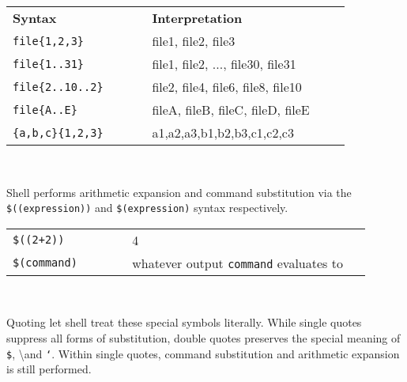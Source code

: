 \documentclass[landscape,a0paper,fontscale=0.285]{baposter} %
\begin{document}
\begin{poster}
{\begin{tabular}{p{0.35\linewidth}p{0.5\linewidth}}
\multicolumn{1}{l}{\textbf{Syntax}} & \multicolumn{1}{l}{\textbf{Interpretation}} \\
\texttt{\small{file\{1,2,3\}}} & file1, file2, file3\\
\texttt{\small{file\{1..31\}}} & file1, file2, ..., file30, file31\\
\texttt{\small{file\{2..10..2\}}} & file2, file4, file6, file8, file10\\
\texttt{\small{file\{A..E\}}} & fileA, fileB, fileC, fileD, fileE \\
\texttt{\small{\{a,b,c\}\{1,2,3\}}} & a1,a2,a3,b1,b2,b3,c1,c2,c3\\
\end{tabular}\\


Shell performs arithmetic expansion and command substitution via the \texttt{\small{\$((expression))}} and \texttt{\small{\$(expression)}} syntax respectively. \\

\begin{tabular}{p{0.3\linewidth}p{0.6\linewidth}}
\texttt{\small{\$((2+2))}} & 4 \\
\texttt{\small{\$(command)}} & whatever output \texttt{\small{command}} evaluates to
\end{tabular}\\

\normal
{}

Quoting let shell treat these special symbols literally. While single quotes suppress all forms of substitution, double quotes preserves the special meaning of \texttt{\$}, \textbackslash and \texttt{`}. Within single quotes,
command substitution and arithmetic expansion is still performed.

}



\end{poster}
\end{document}

